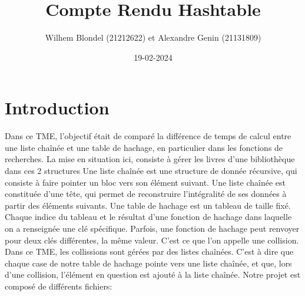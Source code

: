 \documentclass{article}
\title{\Huge Compte Rendu Hashtable}
\date{19-02-2024}
\author{Wilhem Blondel (21212622) et Alexandre Genin (21131809)}
\begin{document}
    \maketitle
    \newpage

    \section{Introduction}
    Dans ce TME, l'objectif était de comparé la différence de temps de calcul
    entre une liste chaînée et une table de hachage, en particulier dans les fonctions
    de recherches. La mise en situation ici, consiste à gérer les livres d'une
    bibliothèque dans ces 2 structures
    \newline \newline
    Une liste chaînée est une structure de donnée récursive, qui consiste à
    faire pointer un bloc vers son élément suivant. Une liste chaînée est 
    constituée d'une tête, qui permet de reconstruire l'intégralité de ses
    données à partir des éléments suivants.
    \newline
    Une table de hachage est un tableau de taille fixé. Chaque indice du tableau
    et le résultat d'une fonction de hachage dans laquelle on a renseignée une
    clé spécifique. Parfois, une fonction de hachage peut renvoyer pour deux clés
    différentes, la même valeur. C'est ce que l'on appelle une collision. 
    \newline
    Dans ce TME, les collissions sont gérées par des listes chaînées. C'est à dire que
    chaque case de notre table de hachage pointe vers une liste chaînée, et que,
    lors d'une collision, l'élément en question est ajouté à la liste chaînée.
    \newline \newline
    Notre projet est composé de différents fichiers:
\end{document}
